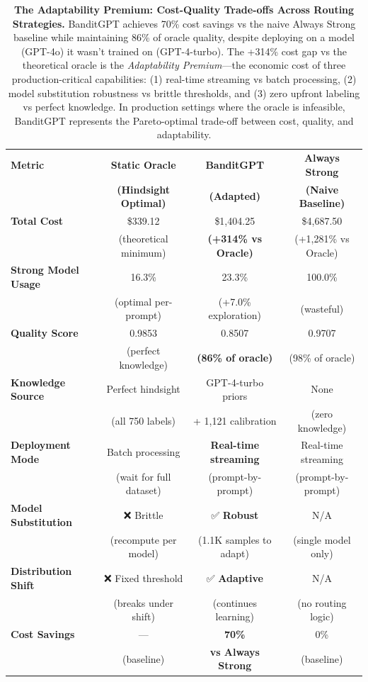 
\begin{table}[t]
\centering
\small
\begin{tabular}{@{}lccc@{}}
\toprule
\textbf{Metric} & \textbf{Static Oracle} & \textbf{BanditGPT} & \textbf{Always Strong} \\
 & \textbf{(Hindsight Optimal)} & \textbf{(Adapted)} & \textbf{(Naive Baseline)} \\ \midrule
\textbf{Total Cost} & \$339.12 & \$1,404.25 & \$4,687.50 \\
 & (theoretical minimum) & \textbf{(+314\% vs Oracle)} & (+1,281\% vs Oracle) \\
\midrule
\textbf{Strong Model Usage} & 16.3\% & 23.3\% & 100.0\% \\
 & (optimal per-prompt) & (+7.0\% exploration) & (wasteful) \\
\midrule
\textbf{Quality Score} & 0.9853 & 0.8507 & 0.9707 \\
 & (perfect knowledge) & \textbf{(86\% of oracle)} & (98\% of oracle) \\
\midrule
\textbf{Knowledge Source} & Perfect hindsight & GPT-4-turbo priors & None \\
 & (all 750 labels) & + 1,121 calibration & (zero knowledge) \\
\midrule
\textbf{Deployment Mode} & Batch processing & \textbf{Real-time streaming} & Real-time streaming \\
 & (wait for full dataset) & (prompt-by-prompt) & (prompt-by-prompt) \\
\midrule
\textbf{Model Substitution} & ❌ Brittle & ✅ \textbf{Robust} & N/A \\
 & (recompute per model) & (1.1K samples to adapt) & (single model only) \\
\midrule
\textbf{Distribution Shift} & ❌ Fixed threshold & ✅ \textbf{Adaptive} & N/A \\
 & (breaks under shift) & (continues learning) & (no routing logic) \\
\midrule
\textbf{Cost Savings} & — & \textbf{70\%} & 0\% \\
 & (baseline) & \textbf{vs Always Strong} & (baseline) \\
\bottomrule
\end{tabular}
\caption{\textbf{The Adaptability Premium: Cost-Quality Trade-offs Across Routing Strategies.} BanditGPT achieves 70\% cost savings vs the naive Always Strong baseline while maintaining 86\% of oracle quality, despite deploying on a model (GPT-4o) it wasn't trained on (GPT-4-turbo). The +314\% cost gap vs the theoretical oracle is the \emph{Adaptability Premium}—the economic cost of three production-critical capabilities: (1) real-time streaming vs batch processing, (2) model substitution robustness vs brittle thresholds, and (3) zero upfront labeling vs perfect knowledge. In production settings where the oracle is infeasible, BanditGPT represents the Pareto-optimal trade-off between cost, quality, and adaptability.}
\label{tab:adaptability_premium}
\end{table}

